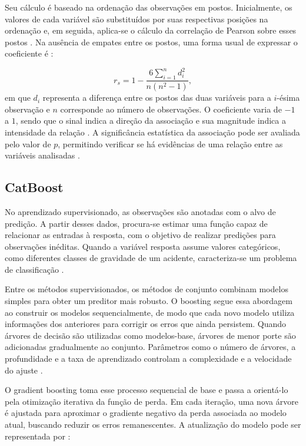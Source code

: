 \documentclass[12pt]{article}
\begin{document}
Seu cálculo é baseado na ordenação das observações em postos. Inicialmente, os valores de cada variável são substituídos por suas respectivas posições na ordenação e, em seguida, aplica-se o cálculo da correlação de Pearson sobre esses postos \cite{field2009discovering}. Na ausência de empates entre os postos, uma forma usual de expressar o coeficiente é \cite{kim2018statistical}:

\begin{equation}
r_s = 1 - \frac{6\sum_{i=1}^{n}d_i^2}{n(n^2-1)},
\end{equation}
em que $d_i$ representa a diferença entre os postos das duas variáveis para a $i$-ésima observação e $n$ corresponde ao número de observações. O coeficiente varia de $-1$ a $1$, sendo que o sinal indica a direção da associação e sua magnitude indica a intensidade da relação \cite{kim2018statistical}. A significância estatística da associação pode ser avaliada pelo valor de $p$, permitindo verificar se há evidências de uma relação entre as variáveis analisadas \cite{field2009discovering}.

\subsection{CatBoost}

No aprendizado supervisionado, as observações são anotadas com o alvo de predição. A partir desses dados, procura-se estimar uma função capaz de relacionar as entradas à resposta, com o objetivo de realizar predições para observações inéditas. Quando a variável resposta assume valores categóricos, como diferentes classes de gravidade de um acidente, caracteriza-se um problema de classificação \cite{james2023islp}.

Entre os métodos supervisionados, os métodos de conjunto combinam modelos simples para obter um preditor mais robusto. O boosting segue essa abordagem ao construir os modelos sequencialmente, de modo que cada novo modelo utiliza informações dos anteriores para corrigir os erros que ainda persistem. Quando árvores de decisão são utilizadas como modelos-base, árvores de menor porte são adicionadas gradualmente ao conjunto. Parâmetros como o número de árvores, a profundidade e a taxa de aprendizado controlam a complexidade e a velocidade do ajuste \cite{james2023islp}.

O gradient boosting toma esse processo sequencial de base e passa a orientá-lo pela otimização iterativa da função de perda. Em cada iteração, uma nova árvore é ajustada para aproximar o gradiente negativo da perda associada ao modelo atual, buscando reduzir os erros remanescentes. A atualização do modelo pode ser representada por \cite{prokhorenkova2018catboost}:
\end{document}
